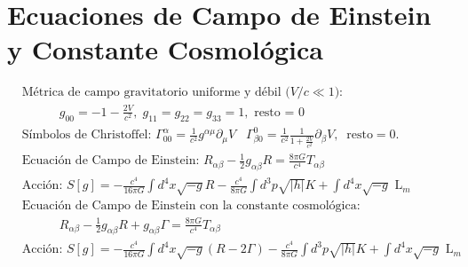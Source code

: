 \section*{Ecuaciones de Campo de Einstein y Constante Cosmológica}
\begin{align*}
    &\text{Métrica de campo gravitatorio uniforme y débil ($V/c \ll 1$): }\\&\quad\quad \quad g_{00} = -1-\frac{2V}{c^2}, \; g_{11} =g_{22} =
    g_{33} = 1, \text{ resto = 0} \\
    & \text{Símbolos de Christoffel: } \Gamma^{\alpha}_{00} = \frac{1}{c^2}g^{\alpha \mu} \partial_{\mu} V\;\;\; \Gamma^{0}_{\beta 0} = \frac{1}{c^2} \frac{1}{1+\frac{2V}{c^2}} \partial_{\beta}V, \;\; \text{resto} = 0.  
    \\& \text{Ecuación de Campo de Einstein: } R_{\alpha \beta}- \frac{1}{2} g_{\alpha \beta }R = \frac{8\pi G}{c^4}T_{\alpha \beta} 
    \\& \text{Acción: } S[g] = -\frac{c^4}{16\pi G} \int d^4 x \sqrt{-g} R - \frac{c^4}{8\pi G} \int d^3 p \sqrt{|h|}K + \int d^4 x\sqrt{-g} \text{ L}_m\\&
    \text{Ecuación de Campo de Einstein con la constante cosmológica: }\\&
    \quad\quad \quad R_{\alpha \beta}- \frac{1}{2} g_{\alpha \beta }R + g_{\alpha \beta} \Gamma  = \frac{8\pi G}{c^4}T_{\alpha \beta}      
    \\& \text{Acción: } S[g] = -\frac{c^4}{16\pi G} \int d^4 x \sqrt{-g} (R-2\Gamma) - \frac{c^4}{8\pi G} \int d^3 p \sqrt{|h|}K + \int d^4 x\sqrt{-g} \text{ L}_m
    \end{align*}
